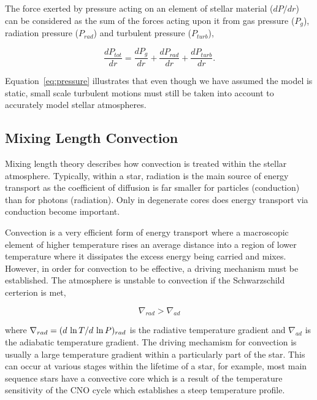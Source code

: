 The force exerted by pressure acting on an element of stellar material ($dP/dr$) can be considered as the sum of the forces acting upon it from gas pressure ($P_{g}$), radiation pressure ($P_{rad}$) and turbulent pressure ($P_{turb}$),

\begin{equation}
    \frac{dP_{tot}}{dr} = \frac{dP_{g}}{dr} + \frac{dP_{rad}}{dr} + \frac{dP_{turb}}{dr}.\label{eq:pressure}
\end{equation}

Equation~\ref{eq:pressure} illustrates that even though we have assumed the model is static, small scale turbulent motions must still be taken into account to accurately model stellar atmospheres.



\subsection{Mixing Length Convection} %
\label{sub:mlt}

Mixing length theory describes how convection is treated within the stellar atmosphere.
Typically, within a star, radiation is the main source of energy transport as the coefficient of diffusion is far smaller for particles (conduction) than for photons (radiation).
Only in degenerate cores does energy transport via conduction become important.

Convection is a very efficient form of energy transport where a macroscopic element of higher temperature rises an average distance into a region of lower temperature where it dissipates the excess energy being carried and mixes.
However, in order for convection to be effective, a driving mechanism must be established.
The atmosphere is unstable to convection if the Schwarzschild certerion is met,

\begin{equation}
    \nabla_{rad} > \nabla_{ad}
\end{equation}

\noindent where $\nabla_{rad} = (d~{\rm ln}\,T/d~{\rm ln}\,P)_{rad}$ is the radiative temperature gradient and $\nabla_{ad}$ is the adiabatic temperature gradient.
The driving mechamism for convection is usually a large temperature gradient within a particularly part of the star.
This can occur at various stages within the lifetime of a star, for example, most main sequence stars have a convective core which is a result of the temperature sensitivity of the CNO cycle which establishes a steep temperature profile.

